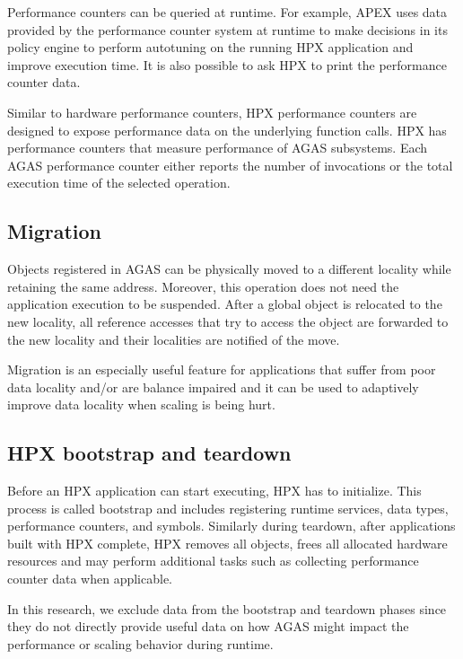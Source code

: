 Performance counters can be queried at runtime. For example, APEX\cite{JSFI64}
uses data provided by the performance counter system at runtime to make
decisions in its policy engine to perform autotuning on the running HPX
application and improve execution time. It is also possible to ask HPX to print
the performance counter data.

Similar to hardware performance counters, HPX performance counters\cite{grubel2015performance} are designed
to expose performance data on the underlying function calls. HPX has
performance counters that measure performance of AGAS subsystems. Each AGAS
performance counter either reports the number of invocations or the total
execution time of the selected operation.

\subsection{Migration}
Objects registered in AGAS can be physically moved to a different locality
while retaining the same address. Moreover, this operation does not need the
application execution to be suspended. After a global object is relocated to
the new locality, all reference accesses that try to access the object are
forwarded to the new locality and their localities are notified of the move.

Migration is an especially useful feature for applications that suffer from
poor data locality and/or are balance impaired and it can be used to adaptively
improve data locality when scaling is being hurt.

\subsection{HPX bootstrap and teardown}
Before an HPX application can start executing, HPX has to initialize. This
process is called bootstrap and includes registering runtime services, data
types, performance counters, and symbols.
Similarly during teardown, after applications built with HPX complete, HPX removes all
objects, frees all allocated hardware resources and may perform additional
tasks such as collecting performance counter data when applicable.

In this research, we exclude data from the bootstrap and teardown phases since
they do not directly provide useful data on how AGAS might impact the
performance or scaling behavior during runtime.
